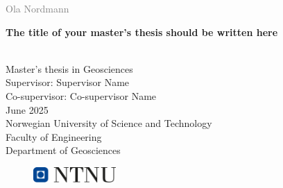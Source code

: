 \documentclass[a4paper, 12pt,oneside]{book} %
\begin{document}


\begin{titlepage}
\vspace*{1.5cm}

\noindent  \textcolor{gray}{\large Ola Nordmann} \\
\vspace{1cm}

\noindent \textbf{\Large The title of your master's thesis should be written here} \\
\vspace{0.5cm}

 \\



\vspace{7cm}
\noindent Master's thesis in Geosciences \\
Supervisor: Supervisor Name \\
Co-supervisor: Co-supervisor Name \\
June 2025 \\

\vspace{0.2cm}
\noindent Norwegian University of Science and Technology \\
Faculty of Engineering \\
Department of Geosciences \\

\begin{figure}[h]
    \includegraphics[width=0.28\textwidth]{Figures/ntnu_basic.png}
\end{figure}
\end{titlepage}
\end{document}
